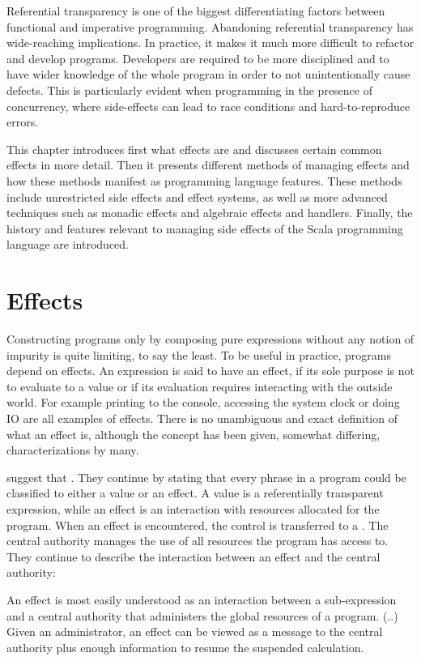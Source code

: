 Referential transparency is one of the biggest differentiating factors between functional and imperative programming. Abandoning referential transparency has wide-reaching implications. In practice, it makes it much more difficult to refactor and develop programs. Developers are required to be more disciplined and to have wider knowledge of the whole program in order to not unintentionally cause defects. This is particularly evident when programming in the presence of concurrency, where side-effects can lead to race conditions and hard-to-reproduce errors.~\cite[Chapter~3]{sicp}

This chapter introduces first what effects are and discusses certain common effects in more detail. Then it presents different methods of managing effects and how these methods manifest as programming language features.  These methods include unrestricted side effects and effect systems, as well as more advanced techniques such as monadic effects and algebraic effects and handlers. Finally, the history and features relevant to managing side effects of the Scala programming language are introduced.


\section{Effects} \label{effects}
Constructing programs only by composing pure expressions without any notion of impurity is quite limiting, to say the least. To be useful in practice, programs depend on effects. An expression is said to have an effect, if its sole purpose is not to evaluate to a value or if its evaluation requires interacting with the outside world. For example printing to the console, accessing the system clock or doing IO are all examples of effects. There is no unambiguous and exact definition of what an effect is, although the concept has been given, somewhat differing, characterizations by many.

\textcite{den-lang-specs} suggest that . They continue by stating that every phrase in a program could be classified to either a value or an effect. A value is a referentially transparent expression, while an effect is an interaction with resources allocated for the program. When an effect is encountered, the control is transferred to a . The central authority manages the use of all resources the program has access to. They continue to describe the interaction between an effect and the central authority:
\begin{displayquote}
An effect is most easily understood as an interaction between a sub-expression
and a central authority that administers the global resources of a program. (..) Given an administrator, an effect can be viewed as a message to the central authority plus enough information to resume the suspended calculation.
\end{displayquote}

